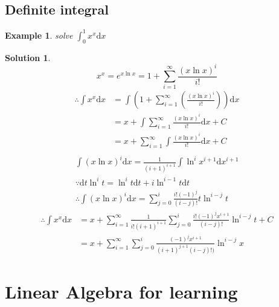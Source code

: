 \documentclass[a4paper,12pt]{report}
\newtheorem{example}{Example}[section]       %
\newtheorem*{solution}{Solution}    %
\begin{document}
\section{Definite integral}
\begin{example}
    solve $\int_0^1x^x\mathrm{d}x$    
\end{example}
\begin{solution}
    $$x^x=e^{x\ln x}=1+\sum_{i=1}^\infty\displaystyle\frac{(x\ln x )^i}{i!}$$
    $$\begin{aligned}
        \therefore\int x^x\mathrm{d}x&=\int(1+\sum_{i=1}^\infty(\displaystyle\frac{(x\ln x )^i}{i!}))\mathrm{d}x\\
        &=x+\int\sum_{i=1}^\infty\displaystyle\frac{(x\ln x )^i}{i!}\mathrm{d}x+C\\
        &=x+\sum_{i=1}^\infty\int\displaystyle\frac{(x\ln x )^i}{i!}\mathrm{d}x+C\\
    \end{aligned}$$
    $$\begin{aligned}
        \int (x\ln x)^i\mathrm{d}x=\displaystyle\frac{1}{(i+1)^{i+1}}\int\ln^ix^{i+1}\mathrm{d}x^{i+1}\\
        \because \mathrm{d}t\ln^it=\ln^it\mathrm{d}t+i\ln^{i-1}t\mathrm{d}t\\
        \therefore \int (x\ln x)^i\mathrm{d}x=\sum_{j=0}^i \displaystyle\frac{i!(-1)^j}{(i-j)!}t\ln^{i-j}t
    \end{aligned}$$
    $$\begin{aligned}
        \therefore \int x^x\mathrm{d}x&=x+\sum_{i=1}^\infty\displaystyle\frac{1}{i!(i+1)^{i+1}}\sum_{j=0}^i \displaystyle\frac{i!(-1)^jx^{i+1}}{(i-j)!}\ln^{i-j}t+C\\
        &=x+\sum_{i=1}^\infty\sum_{j=0}^i \displaystyle\frac{(-1)^jx^{i+1}}{(i+1)^{j+1}(i-j)!)}\ln^{i-j}x
    \end{aligned}$$
\end{solution}
\chapter{Linear Algebra for learning}
\end{document}
